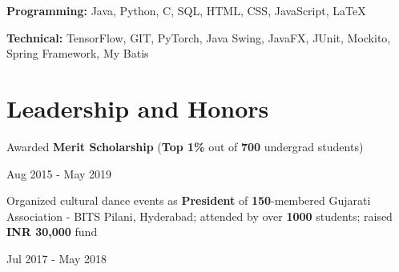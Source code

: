\documentclass[]{Keval-resume}
\begin{document}
\textbullet{} \textbf{Programming:} Java, Python, C, SQL, HTML, CSS, JavaScript, LaTeX

\textbullet{} \textbf{Technical:} TensorFlow, GIT, PyTorch, Java Swing, JavaFX, JUnit, Mockito, Spring Framework, My Batis

\sectionsep

\section{Leadership and Honors} 
\hrulefill
\postsectionsep 

\begin{minipage}[t]{.78\textwidth}
	\textbullet{} Awarded \textbf{Merit Scholarship} (\textbf{Top 1\%} out of \textbf{700} undergrad students)
\end{minipage}%
\begin{minipage}[t]{.22\textwidth}
	\hfill Aug 2015 - May 2019
\end{minipage}

\begin{minipage}[t]{.78\textwidth}
	\textbullet{} Organized cultural dance events as \textbf{President} of \textbf{150}-membered Gujarati Association - BITS Pilani, Hyderabad; attended by over \textbf{1000} students; raised \textbf{INR 30,000} fund
\end{minipage}%
\begin{minipage}[t]{.22\textwidth}
	\hfill Jul 2017 - May 2018
\end{minipage}


\end{document}
